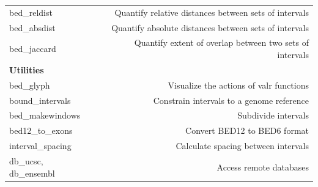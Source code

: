 \documentclass[9pt,a4paper]{extarticle}
\begin{document}
\begin{table}[h!]
\begin{tabular}{lr}
  bed\_reldist & Quantify relative distances between sets of intervals \\
  bed\_absdist & Quantify absolute distances between sets of intervals \\
  bed\_jaccard &Quantify extent of overlap between two sets of intervals \\
\bfseries Utilities &  \\ 
  bed\_glyph & Visualize the actions of valr functions \\ 
  bound\_intervals & Constrain intervals to a genome reference \\
  bed\_makewindows & Subdivide intervals \\
  bed12\_to\_exons & Convert BED12 to BED6 format \\
  interval\_spacing & Calculate spacing between intervals \\
  db\_ucsc, db\_ensembl & Access remote databases \\
  \end{tabular}
\end{table}



\end{document}
